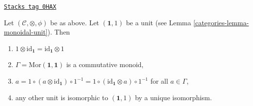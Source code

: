 \begin{lemma}
\label{categories-lemma-monoidal-unit-unique}
\href{https://stacks.math.columbia.edu/tag/0HAX}{\texttt{Stacks tag 0HAX}}

Let $(\mathcal{C}, \otimes, \phi)$ be as above.
Let $(\mathbf{1}, 1)$ be a unit (see Lemma \ref{categories-lemma-monoidal-unit}).
Then
\begin{enumerate}
\item $1 \otimes \text{id}_\mathbf{1} = \text{id}_\mathbf{1} \otimes 1$
\item $\Gamma = \text{Mor}(\mathbf{1}, \mathbf{1})$ is a commutative monoid,
\item  $a = 1 \circ (a \otimes \text{id}_\mathbf{1}) \circ 1^{-1} =
1 \circ (\text{id}_\mathbf{1} \otimes a) \circ 1^{-1}$ for all $a \in \Gamma$,
\item any other unit is isomorphic to $(\mathbf{1}, 1)$
by a unique isomorphism.
\end{enumerate}
\end{lemma}

